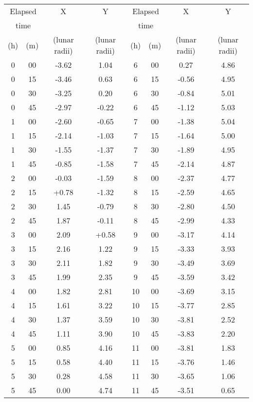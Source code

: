 \begin{center} \begin{tabular}{c c c c|c c c c} \hline \multicolumn{2}{c}{Elapsed} & X & Y & \multicolumn{2}{c}{Elapsed} & X & Y \\ \multicolumn{2}{c}{time} & & & \multicolumn{2}{c}{time} & & \\ (h) & (m) & (lunar radii) & (lunar radii) & (h) & (m) & (lunar radii) & (lunar radii) \\ \hline 0 & 00 & -3.62 & 1.04 & 6 & 00 & 0.27 & 4.86 \\ 0 & 15 & -3.46 & 0.63 & 6 & 15 & -0.56 & 4.95 \\ 0 & 30 & -3.25 & 0.20 & 6 & 30 & -0.84 & 5.01 \\ 0 & 45 & -2.97 & -0.22 & 6 & 45 & -1.12 & 5.03 \\ 1 & 00 & -2.60 & -0.65 & 7 & 00 & -1.38 & 5.04 \\ 1 & 15 & -2.14 & -1.03 & 7 & 15 & -1.64 & 5.00 \\ 1 & 30 & -1.55 & -1.37 & 7 & 30 & -1.89 & 4.95 \\ 1 & 45 & -0.85 & -1.58 & 7 & 45 & -2.14 & 4.87 \\ 2 & 00 & -0.03 & -1.59 & 8 & 00 & -2.37 & 4.77 \\ 2 & 15 & +0.78 & -1.32 & 8 & 15 & -2.59 & 4.65 \\ 2 & 30 & 1.45 & -0.79 & 8 & 30 & -2.80 & 4.50 \\ 2 & 45 & 1.87 & -0.11 & 8 & 45 & -2.99 & 4.33 \\ 3 & 00 & 2.09 & +0.58 & 9 & 00 & -3.17 & 4.14 \\ 3 & 15 & 2.16 & 1.22 & 9 & 15 & -3.33 & 3.93 \\ 3 & 30 & 2.11 & 1.82 & 9 & 30 & -3.49 & 3.69 \\ 3 & 45 & 1.99 & 2.35 & 9 & 45 & -3.59 & 3.42 \\ 4 & 00 & 1.82 & 2.81 & 10 & 00 & -3.69 & 3.15 \\ 4 & 15 & 1.61 & 3.22 & 10 & 15 & -3.77 & 2.85 \\ 4 & 30 & 1.37 & 3.59 & 10 & 30 & -3.81 & 2.52 \\ 4 & 45 & 1.11 & 3.90 & 10 & 45 & -3.83 & 2.20 \\ 5 & 00 & 0.85 & 4.16 & 11 & 00 & -3.81 & 1.83 \\ 5 & 15 & 0.58 & 4.40 & 11 & 15 & -3.76 & 1.46 \\ 5 & 30 & 0.28 & 4.58 & 11 & 30 & -3.65 & 1.06 \\ 5 & 45 & 0.00 & 4.74 & 11 & 45 & -3.51 & 0.65 \\ \hline

\end{tabular} \end{center}

